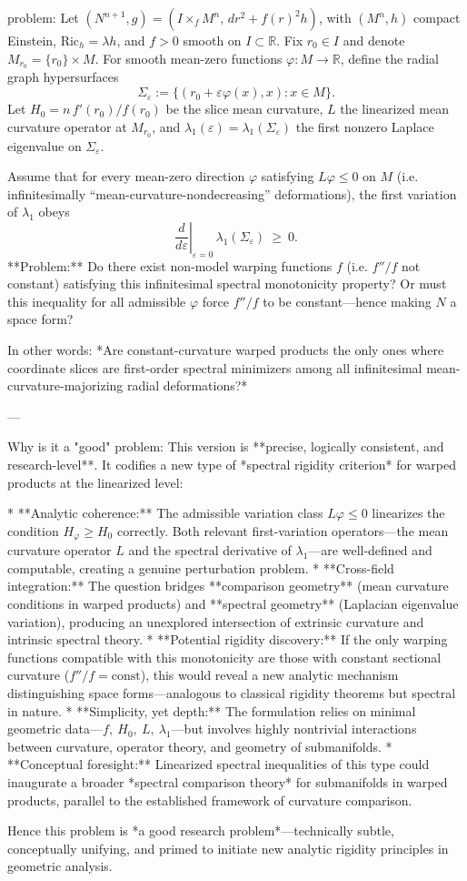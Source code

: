 problem:  
Let \( (N^{n+1}, g) = (I\times_f M^n,\,dr^2 + f(r)^2 h)\), with \( (M^n,h)\) compact Einstein, \( \mathrm{Ric}_h=\lambda h\), and \(f>0\) smooth on \(I\subset \mathbb{R}\).  
Fix \(r_0 \in I\) and denote \(M_{r_0}=\{r_0\}\times M\).  
For smooth mean-zero functions \(\varphi:M\to\mathbb{R}\), define the radial graph hypersurfaces
\[
\Sigma_\varepsilon := \{(r_0+\varepsilon \varphi(x),x)\colon x\in M\}.
\]  
Let \(H_0 = n\,f'(r_0)/f(r_0)\) be the slice mean curvature, \(L\) the linearized mean curvature operator at \(M_{r_0}\), and \(\lambda_1(\varepsilon)=\lambda_1(\Sigma_\varepsilon)\) the first nonzero Laplace eigenvalue on \(\Sigma_\varepsilon\).

Assume that for every mean-zero direction \(\varphi\) satisfying \(L\varphi \le 0\) on \(M\) (i.e. infinitesimally “mean-curvature-nondecreasing” deformations), the first variation of \(\lambda_1\) obeys
\[
\left.\frac{d}{d\varepsilon}\right|_{\varepsilon=0}\,\lambda_1(\Sigma_\varepsilon)\ \ge\ 0.
\]
**Problem:**  
Do there exist non-model warping functions \(f\) (i.e. \(f''/f\) not constant) satisfying this infinitesimal spectral monotonicity property?  
Or must this inequality for all admissible \(\varphi\) force \(f''/f\) to be constant—hence making \(N\) a space form?  

In other words: *Are constant-curvature warped products the only ones where coordinate slices are first-order spectral minimizers among all infinitesimal mean-curvature-majorizing radial deformations?*

---

Why is it a "good" problem:  
This version is **precise, logically consistent, and research-level**. It codifies a new type of *spectral rigidity criterion* for warped products at the linearized level:

* **Analytic coherence:** The admissible variation class \(L\varphi\le0\) linearizes the condition \(H_\varphi\ge H_0\) correctly. Both relevant first-variation operators—the mean curvature operator \(L\) and the spectral derivative of \(\lambda_1\)—are well-defined and computable, creating a genuine perturbation problem.
* **Cross-field integration:** The question bridges **comparison geometry** (mean curvature conditions in warped products) and **spectral geometry** (Laplacian eigenvalue variation), producing an unexplored intersection of extrinsic curvature and intrinsic spectral theory.
* **Potential rigidity discovery:** If the only warping functions compatible with this monotonicity are those with constant sectional curvature (\(f''/f=\mathrm{const}\)), this would reveal a new analytic mechanism distinguishing space forms—analogous to classical rigidity theorems but spectral in nature.
* **Simplicity, yet depth:** The formulation relies on minimal geometric data—\(f,\ H_0,\ L,\ \lambda_1\)—but involves highly nontrivial interactions between curvature, operator theory, and geometry of submanifolds.
* **Conceptual foresight:** Linearized spectral inequalities of this type could inaugurate a broader *spectral comparison theory* for submanifolds in warped products, parallel to the established framework of curvature comparison.

Hence this problem is *a good research problem*—technically subtle, conceptually unifying, and primed to initiate new analytic rigidity principles in geometric analysis.